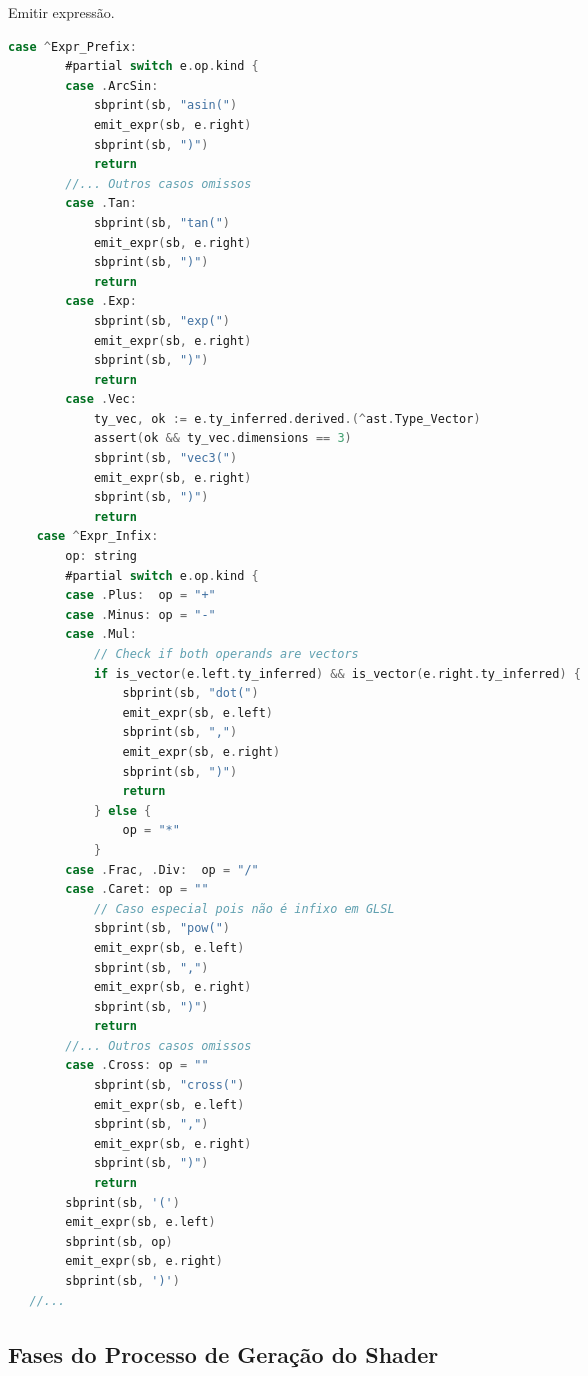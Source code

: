 \begin{codigo}[h] %
   \caption{\small Emitir expressão. }
   \label{cod-emit-expr}
\begin{lstlisting}[language=C, basicstyle=\ttfamily\footnotesize, frame=none, inputencoding=utf8]
    case ^Expr_Prefix:
        #partial switch e.op.kind {
        case .ArcSin:
            sbprint(sb, "asin(")
            emit_expr(sb, e.right)
            sbprint(sb, ")")
            return
        //... Outros casos omissos
        case .Tan:
            sbprint(sb, "tan(")
            emit_expr(sb, e.right)
            sbprint(sb, ")")
            return
        case .Exp:
            sbprint(sb, "exp(")
            emit_expr(sb, e.right)
            sbprint(sb, ")")
            return
        case .Vec:
            ty_vec, ok := e.ty_inferred.derived.(^ast.Type_Vector)
            assert(ok && ty_vec.dimensions == 3)
            sbprint(sb, "vec3(")
            emit_expr(sb, e.right)
            sbprint(sb, ")")
            return
    case ^Expr_Infix:
        op: string
        #partial switch e.op.kind {
        case .Plus:  op = "+"
        case .Minus: op = "-"
        case .Mul:
            // Check if both operands are vectors
            if is_vector(e.left.ty_inferred) && is_vector(e.right.ty_inferred) {
                sbprint(sb, "dot(")
                emit_expr(sb, e.left)
                sbprint(sb, ",")
                emit_expr(sb, e.right)
                sbprint(sb, ")")
                return
            } else {
                op = "*"
            }
        case .Frac, .Div:  op = "/"
        case .Caret: op = ""
            // Caso especial pois não é infixo em GLSL
            sbprint(sb, "pow(")
            emit_expr(sb, e.left)
            sbprint(sb, ",")
            emit_expr(sb, e.right)
            sbprint(sb, ")")
            return
        //... Outros casos omissos
        case .Cross: op = ""
            sbprint(sb, "cross(")
            emit_expr(sb, e.left)
            sbprint(sb, ",")
            emit_expr(sb, e.right)
            sbprint(sb, ")")
            return
        sbprint(sb, '(')
        emit_expr(sb, e.left)
        sbprint(sb, op)
        emit_expr(sb, e.right)
        sbprint(sb, ')')
   //...
\end{lstlisting}
\end{codigo}

\subsection{Fases do Processo de Geração do Shader}
\label{sub-start-emitting}

